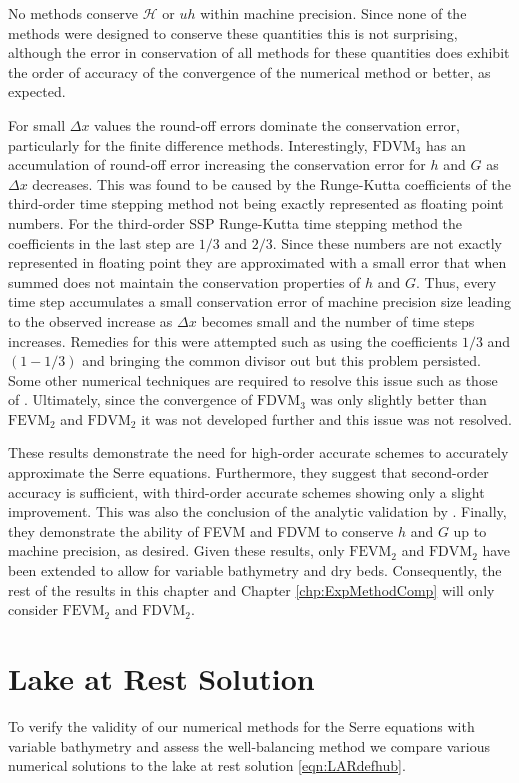No methods conserve $\mathcal{H}$ or $uh$ within machine precision. Since none of the methods were designed to conserve these quantities this is not surprising, although the error in conservation of all methods for these quantities does exhibit the order of accuracy of the convergence of the numerical method or better, as expected. 

For small $\Delta x$ values the round-off errors dominate the conservation error, particularly for the finite difference methods. Interestingly, $\text{FDVM}_3$ has an accumulation of round-off error increasing the conservation error for $h$ and $G$ as $\Delta x$ decreases. This was found to be caused by the Runge-Kutta coefficients of the third-order time stepping method \cite{Zoppou-etal-2017} not being exactly represented as floating point numbers. For the third-order SSP Runge-Kutta time stepping method the coefficients in the last step are $1/3$ and $2/3$. Since these numbers are not exactly represented in floating point they are approximated with a small error that when summed does not maintain the conservation properties of $h$ and $G$. Thus, every time step accumulates a small conservation error of machine precision size leading to the observed increase as $\Delta x$ becomes small and the number of time steps increases. Remedies for this were attempted such as using the coefficients $1/3$ and $(1- 1/3)$ and bringing the common divisor out but this problem persisted. Some other numerical techniques are required to resolve this issue such as those of \citet{higham2002}. Ultimately, since the convergence of $\text{FDVM}_3$ was only slightly better than $\text{FEVM}_2$ and $\text{FDVM}_2$ \cite{Zoppou-etal-2017} it was not developed further and this issue was not resolved.

These results demonstrate the need for high-order accurate schemes to accurately approximate the Serre equations. Furthermore, they suggest that second-order accuracy is sufficient, with third-order accurate schemes showing only a slight improvement. This was also the conclusion of the analytic validation by \citet{Zoppou-etal-2017}. Finally, they demonstrate the ability of FEVM and FDVM to conserve $h$ and $G$ up to machine precision, as desired. Given these results, only $\text{FEVM}_2$ and $\text{FDVM}_2$ have been extended to allow for variable bathymetry and dry beds. Consequently, the rest of the results in this chapter and Chapter \ref{chp:ExpMethodComp} will only consider $\text{FEVM}_2$ and $\text{FDVM}_2$. 

\section{Lake at Rest Solution}
To verify the validity of our numerical methods for the Serre equations with variable bathymetry and assess the well-balancing method we compare various numerical solutions to the lake at rest solution \eqref{eqn:LARdefhub}.

